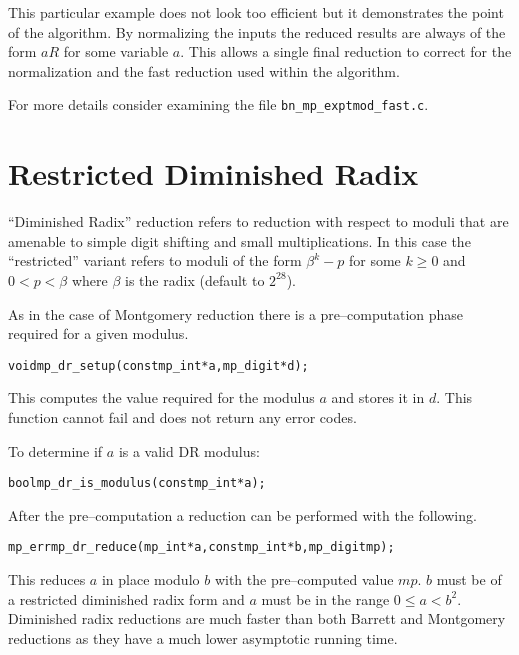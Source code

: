 \documentclass[synpaper]{book}
\begin{document}
This particular example does not look too efficient but it demonstrates the point of the algorithm.
By normalizing the inputs the reduced results are always of the form $aR$ for some variable $a$.
This allows a single final reduction to correct for the normalization and the fast reduction used
within the algorithm.

For more details consider examining the file \texttt{bn\_mp\_exptmod\_fast.c}.

\section{Restricted Diminished Radix}

``Diminished Radix'' reduction refers to reduction with respect to moduli that are amenable to
simple digit shifting and small multiplications.  In this case the ``restricted'' variant refers to
moduli of the form $\beta^k - p$ for some $k \ge 0$ and $0 < p < \beta$ where $\beta$ is the radix
(default to $2^{28}$).

As in the case of Montgomery reduction there is a pre--computation phase required for a given
modulus.

\begin{alltt}
void mp_dr_setup(const mp_int *a, mp_digit *d);
\end{alltt}

This computes the value required for the modulus $a$ and stores it in $d$.  This function cannot
fail and does not return any error codes.

To determine if $a$ is a valid DR modulus:

\begin{alltt}
bool mp_dr_is_modulus(const mp_int *a);
\end{alltt}

After the pre--computation a reduction can be performed with the following.

\begin{alltt}
mp_err mp_dr_reduce(mp_int *a, const mp_int *b, mp_digit mp);
\end{alltt}

This reduces $a$ in place modulo $b$ with the pre--computed value $mp$. $b$ must be of a restricted
diminished radix form and $a$ must be in the range $0 \le a < b^2$.  Diminished radix reductions
are much faster than both Barrett and Montgomery reductions as they have a much lower asymptotic
running time.
\end{document}
